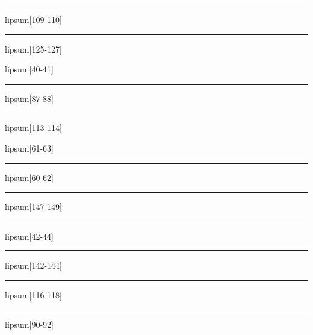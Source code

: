 \documentclass[11pt,a4paper]{article}
\begin{document}
\begin{simplewrap}
  \textcolor{brown!18}{\rule{5.0cm}{8.6cm}}
\end{simplewrap}
lipsum[109-110]

\begin{simplewrap}
  \textcolor{red!33}{\rule{3.9cm}{9.6cm}}
\end{simplewrap}
lipsum[125-127]

lipsum[40-41]

\begin{simplewrap}
  \textcolor{green!28}{\rule{5.5cm}{2.8cm}}
\end{simplewrap}
lipsum[87-88]

\begin{simplewrap}
  \textcolor{purple!48}{\rule{4.1cm}{3.3cm}}
\end{simplewrap}
lipsum[113-114]

lipsum[61-63]

\begin{simplewrap}
  \textcolor{blue!49}{\rule{3.9cm}{8.0cm}}
\end{simplewrap}
lipsum[60-62]

\begin{simplewrap}
  \textcolor{violet!60}{\rule{4.4cm}{8.7cm}}
\end{simplewrap}
lipsum[147-149]

\begin{simplewrap}
  \textcolor{blue!59}{\rule{3.8cm}{5.1cm}}
\end{simplewrap}
lipsum[42-44]

\begin{simplewrap}
  \textcolor{purple!26}{\rule{3.2cm}{5.8cm}}
\end{simplewrap}
lipsum[142-144]

\begin{simplewrap}
  \textcolor{cyan!17}{\rule{3.9cm}{8.1cm}}
\end{simplewrap}
lipsum[116-118]

\begin{simplewrap}
  \textcolor{purple!37}{\rule{3.3cm}{9.3cm}}
\end{simplewrap}
lipsum[90-92]
\end{document}
